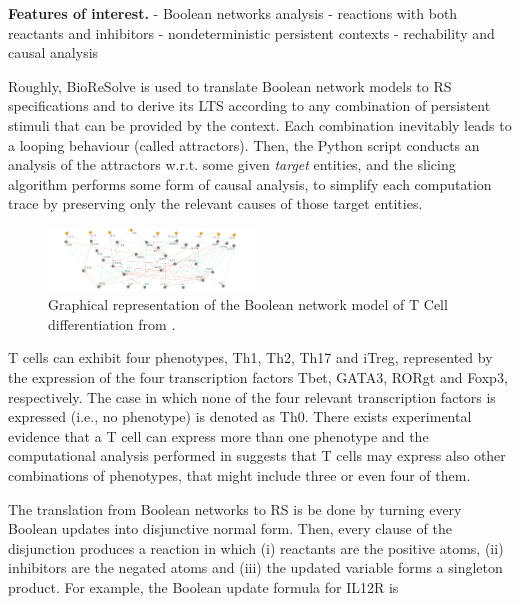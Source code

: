 \medskip\noindent\textbf{Features of interest.}
- Boolean networks analysis
- reactions with both reactants and inhibitors
- nondeterministic persistent contexts
- rechability and causal analysis


Roughly, BioReSolve is used to translate Boolean network models to RS specifications and to derive its LTS according to any combination of persistent stimuli that can be provided by the context. Each combination inevitably leads to a looping behaviour (called attractors). Then, the Python script conducts an analysis of the attractors w.r.t. some given \emph{target} entities, and the slicing algorithm performs some form of causal analysis, to simplify each computation trace by preserving only the relevant causes of those  target entities. 






\begin{figure}[t]
	\begin{center}
		\includegraphics[width=0.49\textwidth]{figs-datamod2023/Tcell-graph-8set23.png}
	\end{center}
	\caption{Graphical representation of the Boolean network model of T Cell differentiation from \cite{puniya2018mechanistic}.}
	\label{fig:model-graph}
\end{figure}



T cells can exhibit four phenotypes, Th1, Th2, Th17 and iTreg, represented by the expression of the four transcription factors Tbet, GATA3, RORgt and Foxp3, respectively.
The case in which none of the four relevant transcription factors is expressed (i.e., no phenotype) is denoted as Th0.
There exists experimental evidence that a T cell can express more than one phenotype \cite{luckheeram2012cd4+} and the computational analysis performed in \cite{puniya2018mechanistic} suggests that T cells may express also other combinations of phenotypes, that might include three or even four of them. 


The translation from Boolean networks to RS is be done by turning every Boolean updates into disjunctive normal form. Then, every clause of the disjunction produces a reaction in which (i) reactants are the positive atoms, (ii) inhibitors are the negated atoms and (iii) the updated variable forms a singleton product. For example, the Boolean update formula for IL12R is

